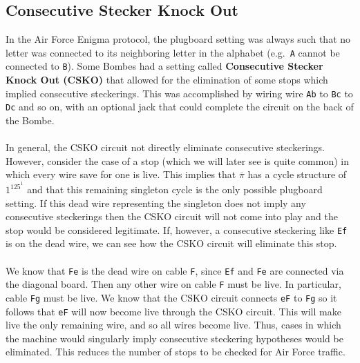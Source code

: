 \subsection{Consecutive Stecker Knock Out}
In the Air Force Enigma protocol, the plugboard setting was always
such that no letter was connected to its neighboring letter in the
alphabet (e.g.\ \texttt{A} cannot be connected to \texttt{B}). Some
Bombes had a setting called {\bf{Consecutive Stecker Knock Out
(CSKO)}} that allowed for the elimination of some stops which implied
consecutive steckerings. This was accomplished by wiring wire
\texttt{Ab} to \texttt{Bc} to \texttt{Dc} and so on, with an optional
jack that could complete the circuit on the back of the Bombe.
\\\\In general, the CSKO circuit not directly eliminate consecutive
steckerings. However, consider the case of a stop (which we will
later see is quite common) in which every wire save for one is live.
This implies that $\overline\pi$ has a cycle structure of $1^125^1$
and that this remaining singleton cycle is the only possible
plugboard setting. If this dead wire representing the singleton does
not imply any consecutive steckerings then the CSKO circuit will not
come into play and the stop would be considered legitimate. If,
however, a consecutive steckering like \texttt{Ef} is on the dead
wire, we can see how the CSKO circuit will eliminate this stop.
\\\\We know that \texttt{Fe} is the dead wire on cable \texttt{F},
since \texttt{Ef} and \texttt{Fe} are connected via the diagonal
board. Then any other wire on cable \texttt{F} must be live. In
particular, cable \texttt{Fg} must be live. We know that the CSKO
circuit connects \texttt{eF} to \texttt{Fg} so it follows that
\texttt{eF} will now become live through the CSKO circuit. This will
make live the only remaining wire, and so all wires become live. Thus,
cases in which the machine would singularly imply consecutive
steckering hypotheses would be eliminated. This reduces
the number of stops to be checked for Air Force traffic.

